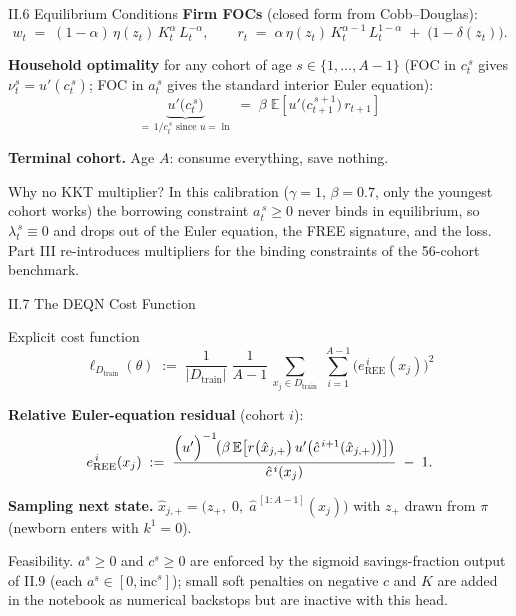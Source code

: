 \documentclass[aspectratio=169,11pt]{beamer}
\newcommand{\emphc}[1]{\textcolor{harvardcrimson}{#1}}
\newcommand{\E}[1]{\mathbb{E}\!\left[#1\right]}
\newcommand{\Loss}{\ell}
\begin{document}
\begin{frame}{II.6 Equilibrium Conditions}
\small
\textbf{Firm FOCs} (closed form from Cobb--Douglas):
\[
w_t \;=\; (1-\alpha)\,\eta(z_t)\, K_t^{\alpha}\, L_t^{-\alpha}, \qquad
r_t \;=\; \alpha\,\eta(z_t)\, K_t^{\alpha-1}\, L_t^{1-\alpha} \;+\; \bigl(1-\delta(z_t)\bigr).
\]

\vspace{0.3em}
\textbf{Household optimality} for any cohort of age $s \in \{1, \ldots, A-1\}$ (FOC in $c_t^{\,s}$ gives $\nu_t^s = u'(c_t^{\,s})$; FOC in $a_t^{\,s}$ gives the standard \emphc{interior} Euler equation):
\[
\boxed{\;\underbrace{u'\!\bigl(c_t^{\,s}\bigr)}_{=\,1/c_t^{\,s}\text{ since }u=\ln} \;=\; \beta\;\E{u'\!\bigl(c_{t+1}^{\,s+1}\bigr)\,r_{t+1}}\;}
\]

\vspace{0.3em}
\textbf{Terminal cohort.}  Age $A$: consume everything, save nothing.

\vspace{0.3em}
{\scriptsize \emphc{Why no KKT multiplier?}  In this calibration ($\gamma=1$, $\beta=0.7$, only the youngest cohort works) the borrowing constraint $a_t^{\,s}\ge 0$ never binds in equilibrium, so $\lambda_t^{\,s}\equiv 0$ and drops out of the Euler equation, the FREE signature, and the loss.  Part III re-introduces multipliers for the binding constraints of the 56-cohort benchmark.}
\end{frame}


\begin{frame}{II.7 The DEQN Cost Function}
\small
\begin{block}{Explicit cost function}
\[
\boxed{\;\Loss_{D_{\text{train}}}(\theta) \;:=\; \frac{1}{|D_{\text{train}}|}\;\frac{1}{A-1}\,
\sum_{x_j \in D_{\text{train}}}\;\sum_{i=1}^{A-1} \bigl(e_{\text{REE}}^{\,i}(x_j)\bigr)^2\;}
\]
\end{block}

\vspace{0.3em}
\textbf{Relative Euler-equation residual} (cohort $i$):
\[
e_{\text{REE}}^{\,i}(x_j) \;:=\;
\frac{\Bigl(u'\Bigr)^{-1}\!\!\left(\beta\,\E{r\bigl(\hat x_{j,+}\bigr)\,u'\bigl(\hat c^{\,i+1}(\hat x_{j,+})\bigr)}\right)}{\hat c^{\,i}(x_j)} \;-\; 1.
\]

\textbf{Sampling next state.}  $\hat x_{j,+} = \bigl(z_+,\; 0,\; \hat a^{\,[1:A-1]}(x_j)\bigr)$ with $z_+$ drawn from $\pi$ (newborn enters with $k^1 = 0$).

{\scriptsize \emphc{Feasibility.}  $a^s\ge 0$ and $c^s\ge 0$ are enforced by the sigmoid savings-fraction output of II.9 (each $a^s\in[0,\mathrm{inc}^s]$); small soft penalties on negative $c$ and $K$ are added in the notebook as numerical backstops but are inactive with this head.}
\end{frame}
\end{document}
